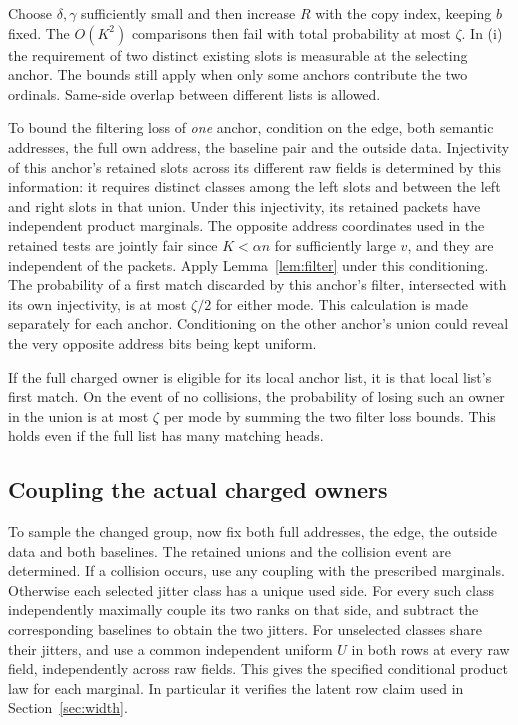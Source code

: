 \documentclass[11pt]{article}
\begin{document}
Choose $\delta,\gamma$ sufficiently small and then increase $R$
with the copy index, keeping $b$ fixed. The $O(K^2)$ comparisons
then fail with total probability at most $\zeta$.
In (i) the requirement of two distinct existing slots is measurable
at the selecting anchor. The bounds still apply when only some anchors
contribute the two ordinals. Same-side overlap between different
lists is allowed.

To bound the filtering loss of \emph{one} anchor, condition on the
edge, both semantic addresses, the full own address, the baseline pair
and the outside data. Injectivity of this anchor's retained slots
across its different raw fields is determined by this information:
it requires distinct classes among the left slots and between the
left and right slots in that union. Under this injectivity, its
retained packets have independent product marginals. The opposite
address coordinates used in the retained tests are jointly fair
since $K<\alpha n$ for sufficiently large $v$, and they are independent
of the packets. Apply Lemma~\ref{lem:filter} under this conditioning.
The probability of a first match discarded by this anchor's filter,
intersected with its own injectivity, is at most $\zeta/2$ for either
mode. This calculation is made separately for each anchor.
Conditioning on the other anchor's union could reveal the very
opposite address bits being kept uniform.

If the full charged owner is eligible for its local anchor list,
it is that local list's first match. On the event of no collisions,
the probability of losing such an owner in the union is at most
$\zeta$ per mode by summing the two filter loss bounds. This holds
even if the full list has many matching heads.

\subsection{Coupling the actual charged owners}\label{sec:coupling}

To sample the changed group, now fix both full addresses, the edge,
the outside data and both baselines. The retained unions and the
collision event are determined. If a collision occurs, use any
coupling with the prescribed marginals. Otherwise each selected
jitter class has a unique used side. For every such class independently
maximally couple its two ranks on that side, and subtract the
corresponding baselines to obtain the two jitters. For unselected
classes share their jitters, and use a common independent uniform
$U$ in both rows at every raw field, independently across raw
fields. This gives the specified conditional product law for each
marginal. In particular it verifies the latent row claim used in
Section~\ref{sec:width}.
\end{document}
